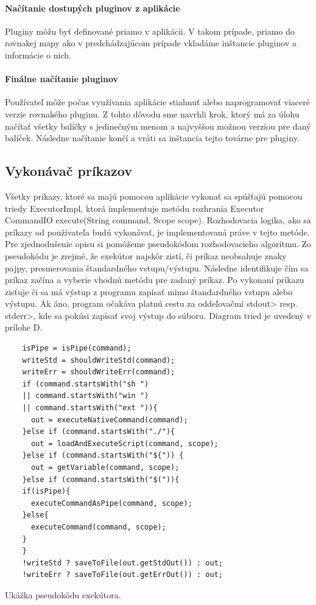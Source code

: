 \paragraph{Načítanie dostupých pluginov z aplikácie}
\indent Pluginy môžu byť definované priamo v aplikácii. V takom prípade, priamo do rovnakej mapy ako v predchádzajúcom prípade vkladáme inštancie pluginov a informácie o nich. 
\paragraph{Finálne načítanie pluginov}
\indent Používateľ môže počas využívania aplikácie stiahnuť alebo naprogramovať viaceré verzie rovnakého pluginu. Z tohto dôvodu sme navrhli  krok, ktorý má za úlohu načítať všetky balíčky s jedinečným menom a najvyššou možnou verziou pre daný balíček. Následne načítanie končí a vráti sa inštancia tejto továrne pre pluginy.
\subsection{Vykonávač príkazov}
\indent Všetky príkazy, ktoré sa majú pomocou aplikácie vykonať sa spúšťajú pomocou triedy ExecutorImpl, ktorá implementuje metódu rozhrania Executor CommandIO execute(String command, Scope scope). Rozhodovacia logika, ako sa príkazy od používateľa budú vykonávať, je implementovaná práve v tejto metóde. Pre zjednodušenie opisu si pomôžeme pseudokódom rozhodovacieho algoritmu. Zo pseudokódu je zrejmé, že exekútor najskôr zistí, či príkaz neobsahuje znaky pajpy, presmerovania štandardného vstupu/výstupu. Následne identifikuje čím sa príkaz začína a vyberie vhodnú metódu pre zadaný príkaz. Po vykonaní príkazu zisťuje či sa má výstup z programu zapísať mimo štandardného vstupu alebo výstupu. Ak áno, program očakáva platnú cestu za oddeľovačmi stdout> \acrshort{resp.} stderr>, kde sa pokúsi zapísať svoj výstup do súboru. Diagram tried je uvedený v prílohe D.
\begin{algorithm}[H]
	\begin{verbatim}
	isPipe = isPipe(command);
	writeStd = shouldWriteStd(command);
	writeErr = shouldWriteErr(command);
	if (command.startsWith("sh ") 
	|| command.startsWith("win ") 
	|| command.startsWith("ext ")){
	  out = executeNativeCommand(command);
	}else if (command.startsWith("./"){
	  out = loadAndExecuteScript(command, scope);
	}else if (command.startsWith("${")) {
	  out = getVariable(command, scope);
	}else if (command.startsWith("$(")){
	if(isPipe){
	  executeCommandAsPipe(command, scope);
	}else{
	  executeCommand(command, scope);
	}
	}
	!writeStd ? saveToFile(out.getStdOut()) : out;
	!writeErr ? saveToFile(out.getErrOut()) : out;
	\end{verbatim}
	\caption{Ukážka pseudokódu exekútora. }
	\label{alg:gen}
\end{algorithm}
\newpage
